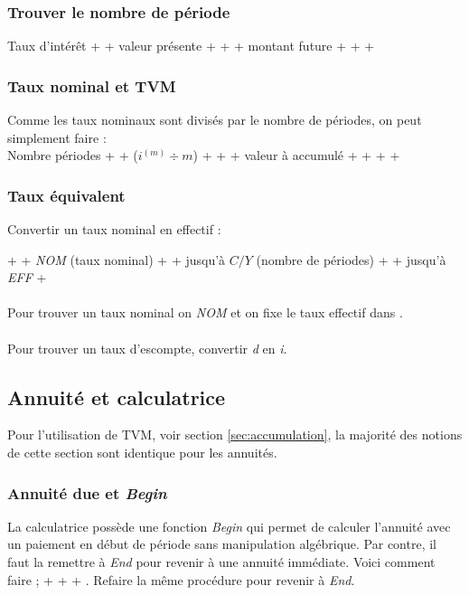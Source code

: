 \subsubsection{Trouver le nombre de période}
Taux d'intérêt +  + valeur présente + \fbox{+$ / $- } +  + montant future +  +  + 

\subsubsection{Taux nominal et TVM}
Comme les taux nominaux sont divisés par le nombre de périodes, on peut simplement faire : \\
Nombre périodes +  + ($i^{(m)} \div m$) + \fbox{=} +  + valeur à accumulé + \fbox{+$ / $-} +  +  + 
\\

\subsubsection{Taux équivalent}

Convertir un taux nominal en effectif : 

 +  + \emph{NOM} (taux nominal) +  + \fbox{$\Downarrow$} jusqu'à \emph{$C / Y$} (nombre de périodes) +  + \fbox{$\Uparrow$} jusqu'à \emph{EFF} + 
\\
\\ Pour trouver un taux nominal on  \emph{NOM} et on fixe le taux effectif dans .
\\
\\ Pour trouver un taux d'escompte, convertir \emph{d} en \emph{i}.

\subsection{Annuité et calculatrice}
\label{Annuité et calculatrice}

Pour l'utilisation de TVM, voir section \ref{sec:accumulation}, la majorité des notions de cette section sont identique pour les annuités.

\subsubsection{Annuité due et \textit{Begin}}
\label{Begin}

La calculatrice possède une fonction \textit{Begin} qui permet de calculer l'annuité avec un paiement en début de période sans manipulation algébrique. Par contre, il faut la remettre à \textit{End} pour revenir à une annuité immédiate. Voici comment faire ;
 +  +  + .
Refaire la même procédure pour revenir à \textit{End}.

